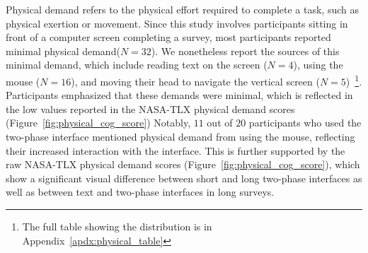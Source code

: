 Physical demand refers to the physical effort required to complete a task, such as physical exertion or movement. Since this study involves participants sitting in front of a computer screen completing a survey, most participants reported minimal physical demand($N=32$). We nonetheless report the sources of this minimal demand, which include reading text on the screen ($N=4$), using the mouse ($N=16$), and moving their head to navigate the vertical screen ($N=5$)~\footnote{The full table showing the distribution is in Appendix~\ref{apdx:physical_table}}. Participants emphasized that these demands were minimal, which is reflected in the low values reported in the NASA-TLX physical demand scores (Figure~\ref{fig:physical_cog_score}) Notably, $11$ out of $20$ participants who used the two-phase interface mentioned physical demand from using the mouse, reflecting their increased interaction with the interface. This is further supported by the raw NASA-TLX physical demand scores (Figure~\ref{fig:physical_cog_score}), which show a significant visual difference between short and long two-phase interfaces as well as between text and two-phase interfaces in long surveys.

